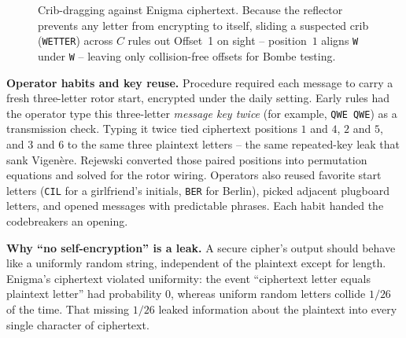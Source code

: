 \begin{figure}[htbp]
\caption{Crib-dragging against Enigma ciphertext. Because the reflector prevents any letter from encrypting to itself, sliding a suspected crib (\texttt{WETTER}) across $C$ rules out Offset~1 on sight -- position~$1$ aligns \texttt{W} under \texttt{W} -- leaving only collision-free offsets for Bombe testing.}
\label{ch02:fig-enigma-crib}
\end{figure}

\begin{attackbox}
\textbf{Operator habits and key reuse.} Procedure required each message to carry a fresh
three-letter rotor start, encrypted under the daily setting. Early rules had the operator type
this three-letter \emph{message key twice} (for example, \texttt{QWE QWE}) as a transmission
check. Typing it twice tied ciphertext positions $1$ and $4$, $2$ and $5$, and $3$ and $6$ to
the same three plaintext letters -- the same repeated-key leak that sank Vigen\`ere. Rejewski
converted those paired positions into permutation equations and solved for the rotor wiring.
Operators also reused favorite start letters (\texttt{CIL} for a girlfriend's initials,
\texttt{BER} for Berlin), picked adjacent plugboard letters, and opened messages with
predictable phrases. Each habit handed the codebreakers an opening.
\end{attackbox}

\begin{whybox}
\textbf{Why ``no self-encryption'' is a leak.} A secure cipher's output should behave like a
uniformly random string, independent of the plaintext except for length. Enigma's ciphertext
violated uniformity: the event ``ciphertext letter equals plaintext letter'' had probability
$0$, whereas uniform random letters collide $1/26$ of the time. That missing $1/26$ leaked
information about the plaintext into every single character of ciphertext.
\end{whybox}

